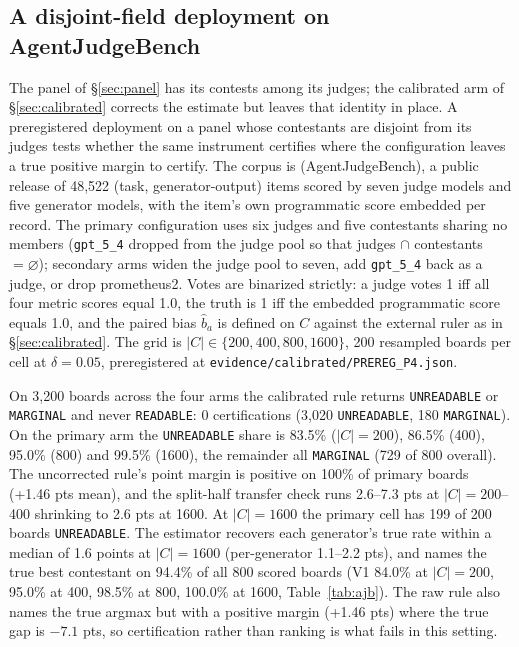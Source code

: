 \documentclass{article}
\newcommand{\ids}[1]{\texttt{\small #1}} %
\begin{document}
\subsection{A disjoint-field deployment on AgentJudgeBench}
\label{sec:ajb} The panel of \S\ref{sec:panel} has its contests among its judges;
the calibrated arm of \S\ref{sec:calibrated} corrects the estimate but leaves that
identity in place. A preregistered deployment on a panel whose contestants are
disjoint from its judges tests whether the same instrument certifies where the
configuration leaves a true positive margin to certify. The corpus is
\cite{verma2026agentjudgebench} (AgentJudgeBench), a public release of
48,522 (task, generator-output) items scored by seven judge models and five
generator models, with the item's own programmatic score embedded per record. The
primary configuration uses six judges and five contestants sharing no members
(\texttt{gpt\_5\_4} dropped from the judge pool so that judges $\cap$ contestants $=
\varnothing$); secondary arms widen the judge pool to seven, add \texttt{gpt\_5\_4}
back as a judge, or drop prometheus2. Votes are binarized strictly: a judge votes 1
iff all four metric scores equal 1.0, the truth is 1 iff the embedded programmatic
score equals 1.0, and the paired bias $\hat b_a$ is defined on $C$ against the
external ruler as in \S\ref{sec:calibrated}. The grid is $|C| \in \{200, 400, 800,
1600\}$, 200 resampled boards per cell at $\delta = 0.05$, preregistered at
\ids{evidence/calibrated/PREREG\_P4.json}.

On 3,200 boards across the four arms the calibrated rule returns
\texttt{UNREADABLE} or \texttt{MARGINAL} and never \texttt{READABLE}: 0 certifications
(3,020 \texttt{UNREADABLE}, 180 \texttt{MARGINAL}). On the primary arm the
\texttt{UNREADABLE} share is 83.5\% ($|C|=200$), 86.5\% (400), 95.0\% (800) and
99.5\% (1600), the remainder all \texttt{MARGINAL} (729 of 800 overall). The
uncorrected rule's point margin is positive on 100\% of primary boards (+1.46 pts
mean), and the split-half transfer check runs 2.6--7.3 pts at $|C|=200$--400
shrinking to 2.6 pts at 1600. At $|C|=1600$ the primary cell has 199 of 200 boards
\texttt{UNREADABLE}. The estimator recovers each generator's true rate within a
median of 1.6 points at $|C|=1600$ (per-generator 1.1--2.2 pts), and names the true
best contestant on 94.4\% of all 800 scored boards (V1 84.0\% at $|C|=200$, 95.0\% at
400, 98.5\% at 800, 100.0\% at 1600, Table~\ref{tab:ajb}). The raw
rule also names the true argmax but with a positive margin (+1.46 pts) where the
true gap is $-7.1$ pts, so certification rather than ranking is what fails in this setting.
\end{document}
